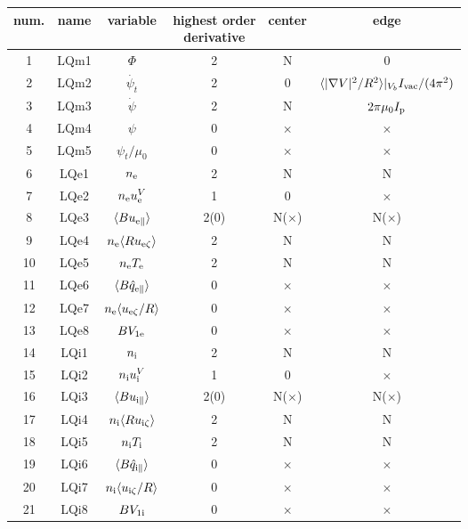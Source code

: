 \documentclass[11pt]{article}
\def\r#1{{\rm#1}}
\def\aves#1{\langle#1\rangle}
\def\para{\parallel}
\def\psid{\dot{\psi}}
\def\psit{\psi_t}
\def\psitd{\dot{\psit}}
\def\nee{n_\r{e}}
\def\ni{n_\r{i}}
\def\Te{T_\r{e}}
\def\Ti{T_\r{i}}
\def\uzt#1{u_{\r{#1}\zeta}}
\def\upara#1{u_{\r{#1}\para}}
\def\qhatpara#1{\hat{q}_{\r{#1}\para}}
\def\uV#1{u_\r{#1}^V}
\begin{document}
%
\begin{tabular}{|c|c|c|c|c|c|}\hline
 num. & name & variable               & \shortstack{highest order\\ derivative} & center & edge \\\hline
 1    & LQm1 & $\Phi$                 & 2    &  N           & 0\\
 2    & LQm2 & $\psitd$               & 2    &  0           & $\aves{|\nabla V|^2/R^2}|_{V_b}I_\r{vac}/(4\pi^2)$\\
 3    & LQm3 & $\psid$                & 2    &  N           & $2\pi\mu_0I_\r{p}$\\
 4    & LQm4 & $\psi$                 & 0    &  $\times$    & $\times$\\
 5    & LQm5 & $\psit/\mu_0$          & 0    &  $\times$    & $\times$\\
 6    & LQe1 & $\nee$                 & 2    &  N           & N\\
 7    & LQe2 & $\nee\uV{e}$           & 1    &  0           & $\times$\\
 8    & LQe3 & $\aves{B\upara{e}}$    & 2(0) &  N($\times$) & N($\times$)\\
 9    & LQe4 & $\nee\aves{R\uzt{e}}$  & 2    &  N           & N\\
 10   & LQe5 & $\nee \Te$             & 2    &  N           & N\\
 11   & LQe6 & $\aves{B\qhatpara{e}}$ & 0    &  $\times$    & $\times$\\
 12   & LQe7 & $\nee\aves{\uzt{e}/R}$ & 0    &  $\times$    & $\times$\\
 13   & LQe8 & $B V_{1\r{e}}$         & 0    &  $\times$    & $\times$\\
 14   & LQi1 & $\ni$                  & 2    &  N           & N\\
 15   & LQi2 & $\ni\uV{i}$            & 1    &  0           & $\times$\\
 16   & LQi3 & $\aves{B\upara{i}}$    & 2(0) &  N($\times$) & N($\times$)\\
 17   & LQi4 & $\ni\aves{R\uzt{i}}$   & 2    &  N           & N\\
 18   & LQi5 & $\ni \Ti$              & 2    &  N           & N\\
 19   & LQi6 & $\aves{B\qhatpara{i}}$ & 0    &  $\times$    & $\times$\\
 20   & LQi7 & $\ni\aves{\uzt{i}/R}$  & 0    &  $\times$    & $\times$\\
 21   & LQi8 & $B V_{1\r{i}}$         & 0    &  $\times$    & $\times$\\

\end{tabular}
\end{document}
